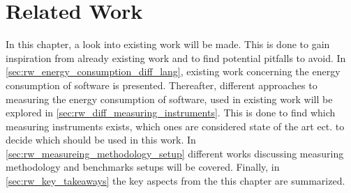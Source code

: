 \chapter{Related Work}\label{ch:related_work}

In this chapter, a look into existing work will be made. This is done to gain inspiration from already existing work and to find potential pitfalls to avoid. In \cref{sec:rw_energy_consumption_diff_lang}, existing work concerning the energy consumption of software is presented. Thereafter, different approaches to measuring the energy consumption of software, used in existing work will be explored in \cref{sec:rw_diff_measuring_instruments}. This is done to find which measuring instruments exists, which ones are considered state of the art ect. to decide which should be used in this work. In \cref{sec:rw_measureing_methodology_setup} different works discussing measuring methodology and benchmarks setups will be covered. Finally, in \cref{sec:rw_key_takeaways} the key aspects from the this chapter are summarized.


% 


